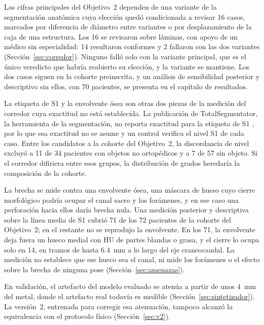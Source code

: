 Las cifras principales del Objetivo~2 dependen de una variante de la segmentación anatómica cuya elección quedó condicionada a revisar 16 casos, marcados por diferencia de diámetro entre variantes o por desplazamiento de la caja de una estructura. Los 16 se revisaron sobre láminas, con apoyo de un médico sin especialidad: 14 resultaron conformes y 2 fallaron con las dos variantes (Sección~\ref{sec:corredor}). Ninguno falló solo con la variante principal, que es el único veredicto que habría reabierto su elección, y la variante se mantiene. Los dos casos siguen en la cohorte preinscrita, y un análisis de sensibilidad posterior y descriptivo sin ellos, con 70 pacientes, se presenta en el capítulo de resultados.

La etiqueta de S1 y la envolvente ósea son otras dos piezas de la medición del corredor cuya exactitud no está establecida. La publicación de TotalSegmentator, la herramienta de la segmentación, no reporta exactitud para la etiqueta de S1 \cite{wasserthal2023}, por lo que esa exactitud no se asume y un control verifica el nivel S1 de cada caso. Entre los candidatos a la cohorte del Objetivo~2, la discordancia de nivel excluyó a 11 de 34 pacientes con objetos no ortopédicos y a 7 de 57 sin objeto. Si el corredor difiriera entre esos grupos, la distribución de grados heredaría la composición de la cohorte.

La brecha se mide contra una envolvente ósea, una máscara de hueso cuyo cierre morfológico podría ocupar el canal sacro y los forámenes, y en ese caso una perforación hacia ellos daría brecha nula. Una medición posterior y descriptiva sobre la línea media de S1 cubrió 71 de los 72 pacientes de la cohorte del Objetivo~2; en el restante no se reprodujo la envolvente. En los 71, la envolvente deja fuera un hueco medial con HU de partes blandas o grasa, y el cierre lo ocupa solo en 14, en tramos de hasta 6.4~mm a lo largo del eje craneocaudal. La medición no establece que ese hueco sea el canal, ni mide los forámenes o el efecto sobre la brecha de ninguna pose (Sección~\ref{sec:amenazas}).

  En validación, el artefacto del modelo evaluado se atenúa a partir de unos 4~mm del metal, donde el artefacto real todavía es medible (Sección~\ref{sec:sintetizador}). La versión~2, entrenada para corregir esa atenuación, tampoco alcanzó la equivalencia con el protocolo físico (Sección~\ref{sec:v2}). 

